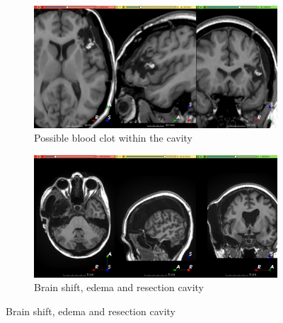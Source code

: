 \begin{figure}
  \begin{subfigure}{0.49\textwidth}
    \centering
    \includegraphics[width=\linewidth]{figures/hard_5}
    \caption{Possible blood clot within the cavity}
    \label{fig:hard_sub_5}
  \end{subfigure}
  \hfill
  \begin{subfigure}{0.49\textwidth}
    \centering
    \includegraphics[width=\linewidth]{figures/hard_6}
    \caption{Brain shift, edema and resection cavity}
    \label{fig:hard_sub_6}
  \end{subfigure}

  \bigskip


\end{figure}
